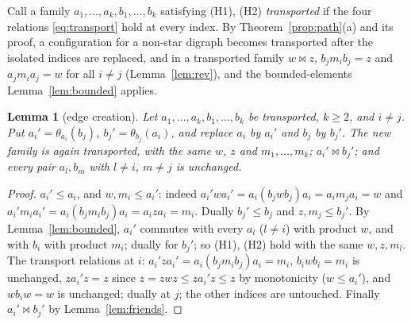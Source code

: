 \documentclass[11pt]{amsart}
\newtheorem{lemma}[theorem]{Lemma}
\theoremstyle{definition}
\newcommand{\mt}{\bowtie}   %
\begin{document}
Call a family $a_1,\dots,a_k,b_1,\dots,b_k$ satisfying (H1), (H2) \emph{transported} if the four relations \eqref{eq:transport} hold at every index. By Theorem~\ref{prop:path}(a) and its proof, a configuration for a non-star digraph becomes transported after the isolated indices are replaced, and in a transported family $w\mt z$, $b_jm_ib_j=z$ and $a_jm_ia_j=w$ for all $i\ne j$ (Lemma~\ref{lem:rev}), and the bounded-elements Lemma~\ref{lem:bounded} applies.

\begin{lemma}[edge creation]\label{lem:create}
Let $a_1,\dots,a_k,b_1,\dots,b_k$ be transported, $k\ge2$, and $i\ne j$. Put $a_i'=\theta_{a_i}(b_j)$, $b_j'=\theta_{b_j}(a_i)$, and replace $a_i$ by $a_i'$ and $b_j$ by $b_j'$. The new family is again transported, with the same $w$, $z$ and $m_1,\dots,m_k$; $a_i'\mt b_j'$; and every pair $a_l,b_m$ with $l\ne i$, $m\ne j$ is unchanged.
\end{lemma}
\begin{proof}
$a_i'\le a_i$, and $w,m_i\le a_i'$: indeed $a_i'wa_i'=a_i(b_jwb_j)a_i=a_im_ja_i=w$ and $a_i'm_ia_i'=a_i(b_jm_ib_j)a_i=a_iza_i=m_i$. Dually $b_j'\le b_j$ and $z,m_j\le b_j'$. By Lemma~\ref{lem:bounded}, $a_i'$ commutes with every $a_l$ ($l\ne i$) with product $w$, and with $b_i$ with product $m_i$; dually for $b_j'$; so (H1), (H2) hold with the same $w,z,m_l$. The transport relations at $i$: $a_i'za_i'=a_i(b_jm_ib_j)a_i=m_i$, $b_iwb_i=m_i$ is unchanged, $za_i'z=z$ since $z=zwz\le za_i'z\le z$ by monotonicity ($w\le a_i'$), and $wb_iw=w$ is unchanged; dually at $j$; the other indices are untouched. Finally $a_i'\mt b_j'$ by Lemma~\ref{lem:friends}.
\end{proof}
\end{document}
